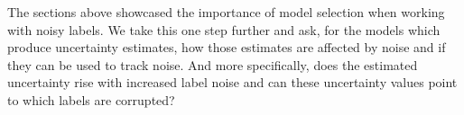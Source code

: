 
The sections above showcased the importance of model selection when working with noisy labels. We take this one step further and ask, for the models which produce uncertainty estimates, how those estimates are affected by noise and if they can be used to track noise. And more specifically, does the estimated uncertainty rise with increased label noise and can these uncertainty values point to which labels are corrupted? 

